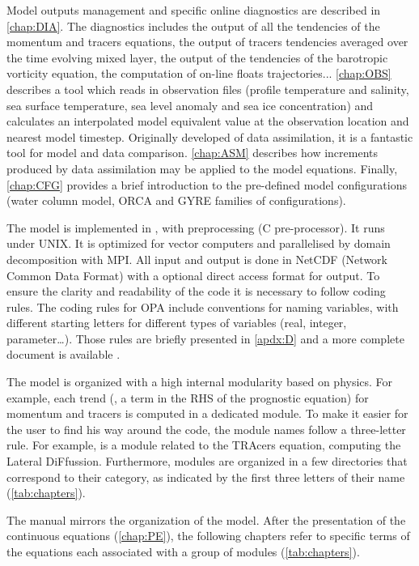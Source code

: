 \documentclass[../main/NEMO_manual]{subfiles}
\begin{document}
Model outputs management and specific online diagnostics are described in \autoref{chap:DIA}.
The diagnostics includes the output of all the tendencies of the momentum and tracers equations,
the output of tracers tendencies averaged over the time evolving mixed layer,
the output of the tendencies of the barotropic vorticity equation,
the computation of on-line floats trajectories...
\autoref{chap:OBS} describes a tool which reads in observation files
(profile temperature and salinity, sea surface temperature, sea level anomaly and sea ice concentration) 
and calculates an interpolated model equivalent value at the observation location and nearest model timestep.
Originally developed of data assimilation, it is a fantastic tool for model and data comparison.
\autoref{chap:ASM} describes how increments produced by data assimilation may be applied to the model equations.
Finally, \autoref{chap:CFG} provides a brief introduction to the pre-defined model configurations
(water column model, ORCA and GYRE families of configurations).

The model is implemented in \fninety, with preprocessing (C pre-processor).
It runs under UNIX.
It is optimized for vector computers and parallelised by domain decomposition with MPI.
All input and output is done in NetCDF (Network Common Data Format) with a optional direct access format for output.
To ensure the clarity and readability of the code it is necessary to follow coding rules.
The coding rules for OPA include conventions for naming variables,
with different starting letters for different types of variables (real, integer, parameter\ldots).
Those rules are briefly presented in \autoref{apdx:D} and a more complete document is available .

The model is organized with a high internal modularity based on physics.
For example, each trend (\ie, a term in the RHS of the prognostic equation) for momentum and tracers
is computed in a dedicated module.
To make it easier for the user to find his way around the code, the module names follow a three-letter rule.
For example,  is a module related to the TRAcers equation, computing the Lateral DiFfussion.
Furthermore, modules are organized in a few directories that correspond to their category,
as indicated by the first three letters of their name (\autoref{tab:chapters}).

The manual mirrors the organization of the model.
After the presentation of the continuous equations (\autoref{chap:PE}),
the following chapters refer to specific terms of the equations each associated with a group of modules 
(\autoref{tab:chapters}).
\end{document}
